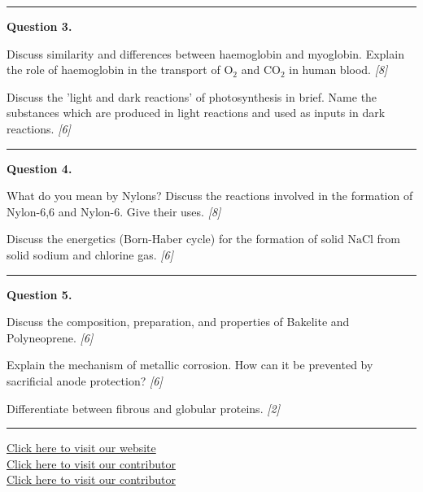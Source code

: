 \documentclass[11pt,a4paper]{article}
\newcommand{\pts}[1]{\hfill   \textit{[#1]}}
\begin{document}
\medskip\rule{\linewidth}{0.2pt}




\noindent   \textbf{Question 3.}

\begin{parts}
  \item Discuss similarity and differences between haemoglobin and myoglobin. Explain the role of haemoglobin in the transport of $ \text{O}_2$ and $ \text{CO}_2$ in human blood. \pts{8}
  \item Discuss the 'light and dark reactions' of photosynthesis in brief. Name the substances which are produced in light reactions and used as inputs in dark reactions. \pts{6}
\end{parts}

\medskip\rule{\linewidth}{0.2pt}




\noindent   \textbf{Question 4.}

\begin{parts}
  \item What do you mean by Nylons? Discuss the reactions involved in the formation of Nylon-6,6 and Nylon-6. Give their uses. \pts{8}
  \item Discuss the energetics (Born-Haber cycle) for the formation of solid $ \text{NaCl}$ from solid sodium and chlorine gas. \pts{6}
\end{parts}

\medskip\rule{\linewidth}{0.2pt}




\noindent   \textbf{Question 5.}

\begin{parts}
  \item Discuss the composition, preparation, and properties of Bakelite and Polyneoprene. \pts{6}
  \item Explain the mechanism of metallic corrosion. How can it be prevented by sacrificial anode protection? \pts{6}
  \item Differentiate between fibrous and globular proteins. \pts{2}
\end{parts}

\vfill
\rule{\linewidth}{0.4pt}

\begin{center}\small
  \href{https://bhu-exam.vercel.app/}{Click here to visit our website}\\[4pt]
  \href{https://me-aryan.vercel.app/}{Click here to visit our contributor}\\[4pt]
  \href{https://quashan-me.vercel.app/}{Click here to visit our contributor}
\end{center}
\end{document}
